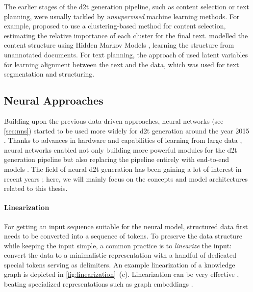 {The earlier stages of the \ac{d2t} generation pipeline, such as content selection or text planning, were usually tackled by \emph{unsupervised} machine learning methods. For example, \citet{duboue2003statistical} proposed to use a clustering-based method for content selection, estimating the relative importance of each cluster for the final text. \citet{barzilay2004catching} modelled the content structure using Hidden Markov Models \cite{baum1966statistical}, learning the structure from unannotated documents. For text planning, the approach of \citet{liang2009learning} used latent variables for learning alignment between the text and the data, which was used for text segmentation and structuring.

\subsection{Neural Approaches}
\label{sec:neural-d2t}
Building upon the previous data-driven approaches, neural networks (see \autoref{sec:nns}) started to be used more widely for \ac{d2t} generation around the year 2015 \cite{dusekTrainingNaturalLanguage2015,wen2015toward}. Thanks to advances in hardware \cite{hooker2021hardware} and capabilities of learning from large data \cite{lecun2015deep}, neural networks enabled not only building more powerful modules for the \ac{d2t} generation pipeline but also replacing the pipeline entirely with end-to-end models \cite{dusekEvaluatingStateoftheartEndtoEnd2020}. The field of neural \ac{d2t} generation has been gaining a lot of interest in recent years \cite{sharmaInnovationsNeuralDatatotext2022,lin2023survey}; here, we will mainly focus on the concepts and model architectures related to this thesis.


\paragraph{Linearization} For getting an input sequence suitable for the neural model, structured data first needs to be converted into a sequence of tokens. To preserve the data structure while keeping the input simple, a common practice is to \emph{linearize} the input: convert the data to a minimalistic representation with a handful of dedicated special tokens serving as delimiters. An example linearization of a knowledge graph is depicted in \autoref{fig:linearization}~(c). Linearization can be very effective \cite{yang2020improving,hoyle2021promoting,xieUnifiedSKGUnifyingMultiTasking2022}, beating specialized representations such as graph embeddings \cite{marcheggianiDeepGraphConvolutional2018,koncel-kedziorskiTextGenerationKnowledge2019}.

}
